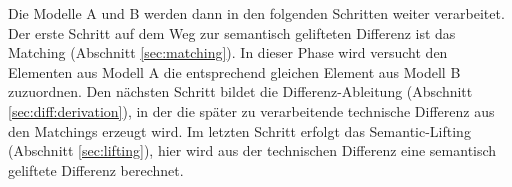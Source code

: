 Die Modelle A und B werden dann in den folgenden Schritten weiter verarbeitet. Der erste Schritt auf
dem Weg zur semantisch gelifteten Differenz ist das Matching (Abschnitt \ref{sec:matching}). In
dieser Phase wird versucht den Elementen aus Modell A die entsprechend gleichen Element aus Modell B
zuzuordnen. Den nächsten Schritt bildet die Differenz-Ableitung (Abschnitt
\ref{sec:diff:derivation}), in der die später zu verarbeitende technische Differenz aus den
Matchings erzeugt wird. Im letzten Schritt erfolgt das Semantic-Lifting (Abschnitt
\ref{sec:lifting}), hier wird aus der technischen Differenz eine semantisch geliftete Differenz
berechnet.





